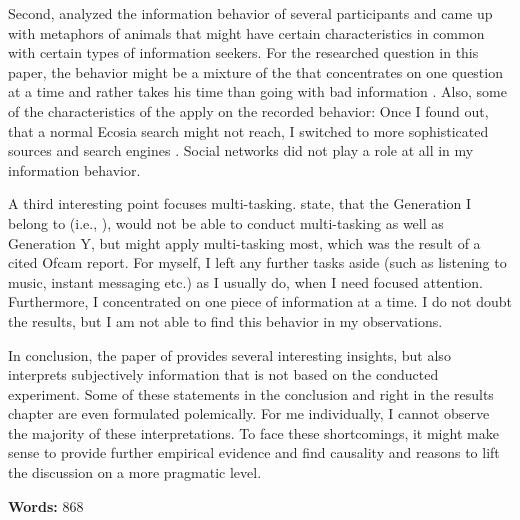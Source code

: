 \documentclass[11pt,letterpaper]{article}
\begin{document}
Second, \cite[pp. 31-32]{Nicholas.2011} analyzed the information behavior of several participants and came up with metaphors of animals that might have certain characteristics  in common with certain types of information seekers. For the researched question in this paper, the behavior might be a mixture of the  that concentrates on one question at a time and rather takes his time than going with bad information \autocite[p. 31]{Nicholas.2011}. Also, some of the characteristics  of the  apply on the recorded behavior: Once I found out, that a normal Ecosia search might not reach, I switched to more sophisticated sources and search engines \autocite[p. 32]{Nicholas.2011}. Social networks did not play a role at all in my information behavior.

A third interesting point focuses multi-tasking. \cite[p. 38]{Nicholas.2011} state, that the Generation I belong to (i.e., ), would not be able to conduct multi-tasking as well as Generation Y, but might apply multi-tasking most, which was the result of a cited Ofcam report. For myself, I left any further tasks aside (such as listening to music, instant messaging etc.) as I usually do, when I need focused attention. Furthermore, I concentrated on one piece of information at a time. I do not doubt the results, but I am not able to find this behavior in my observations.

In conclusion, the paper of \cite[pp. 31-32]{Nicholas.2011} provides several interesting insights, but also interprets subjectively information that is not based on the conducted experiment. Some of these statements in the conclusion and right in the results chapter are even formulated polemically. For me individually, I cannot observe the majority of these interpretations. To face these shortcomings, it might make sense to provide further empirical evidence and find causality and reasons to lift the discussion on a more pragmatic level.
\newline

\noindent \textbf{Words:} 868

\printbibliography

\newpage
\end{document}
